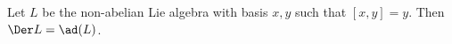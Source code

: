 Let $L$ be the non-abelian Lie algebra with basis $x, y$ such that $[x, y] = y$.
Then $\Der L = \ad(L)$.

